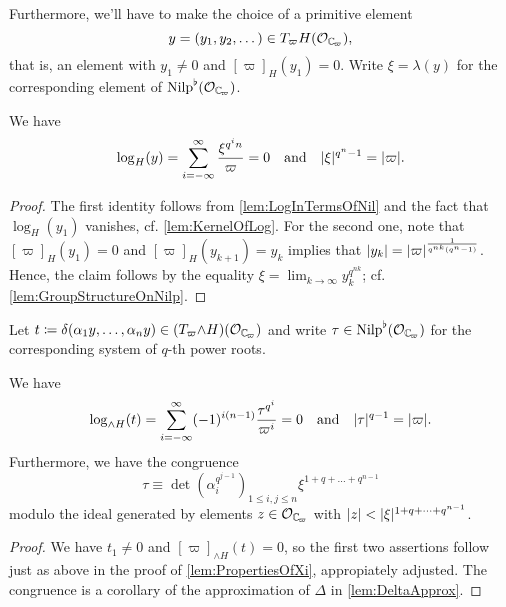 \documentclass[../main.tex]{subfiles}
\begin{document}
Furthermore, we'll have to make the choice of a primitive element 
$$y = (y_1, y_2, \dots) \in T_\varpi H(\cO_\Cp),$$ that is,
an element with $y_1 \neq 0$ and $[\varpi]_H(y_1) = 0$. Write $\xi = \lambda(y)$ 
for the corresponding element of $\Nilp^\flat(\cO_\Cp)$. 

\begin{lem}\label{lem:PropertiesOfXi}
  We have \begin{equation*}
    \log_H(y) = \sum_{i = -\infty}^ \infty \frac{\xi^{q^in}}{\varpi} = 0
    \quad \text{and} \quad
    \lvert \xi \rvert^{q^n-1} = \lvert \varpi \rvert.
  \end{equation*}
\begin{proof}
  The first identity follows from \cref{lem:LogInTermsOfNil} and the fact that
  $\log_H(y_1)$ vanishes, cf. \cref{lem:KernelOfLog}. For the second one, note
  that $[\varpi]_H(y_1) = 0$ and $[\varpi]_H(y_{k+1}) = y_k$ implies that
  $\lvert y_k \rvert = \lvert \varpi \rvert^{\frac{1}{q^{nk}(q^n-1)}}$. Hence, the claim follows
  by the equality $\xi = \lim_{k \to \infty} y_k^{q^{nk}}$; cf. \cref{lem:GroupStructureOnNilp}.
\end{proof}
\end{lem}

Let $t \coloneq \delta(\alpha_1 y, \dots, \alpha_n y) \in (T_\varpi {\wedge H})(\cO_\Cp)$
and write $\tau \in \Nilp^\flat(\cO_\Cp)$ for the corresponding system of $q$-th 
power roots.

\begin{lem}\label{lem:PropertiesOfTau}
  We have 
  \begin{equation*}
    \log_{\wedge H}(t) = 
    \sum_{i = -\infty}^\infty (-1)^{i(n-1)} \frac{\tau^{q^i}}{\varpi^i} = 0 
    \quad \text{and} \quad 
    \lvert \tau \rvert^{q-1} = \lvert \varpi \rvert.
  \end{equation*}
  Furthermore, we have the congruence
  \begin{equation*}
    \tau \equiv \det(\alpha_i^{q^{j-1}})_{1 \leq i,j \leq n} \xi^{1 + q + \dots + q^{n-1}}
  \end{equation*}
  modulo the ideal generated by elements $z \in \cO_\Cp$ with $\lvert z \rvert < \lvert \xi \rvert^{1 + q + \dots + q^{n-1}}$. 
\begin{proof}
  We have $t_1 \neq 0$ and $[\varpi]_{\wedge H}(t) = 0$, so the first two
  assertions follow just as above in the proof of 
  \cref{lem:PropertiesOfXi}, appropiately adjusted. The congruence is a
  corollary of the approximation of $\Delta$ in \cref{lem:DeltaApprox}.
\end{proof}
\end{lem}
\end{document}
